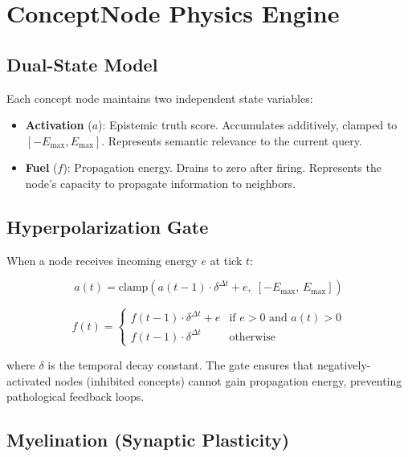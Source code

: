 \documentclass[11pt,a4paper]{article}
\begin{document}
\section{ConceptNode Physics Engine}
\label{sec:engine}

\subsection{Dual-State Model}

Each concept node maintains two independent state variables:

\begin{itemize}
  \item \textbf{Activation} ($a$): Epistemic truth score. Accumulates additively, clamped to $[-E_{\max}, E_{\max}]$. Represents semantic relevance to the current query.
  \item \textbf{Fuel} ($f$): Propagation energy. Drains to zero after firing. Represents the node's capacity to propagate information to neighbors.
\end{itemize}

\subsection{Hyperpolarization Gate}

When a node receives incoming energy $e$ at tick $t$:

\begin{equation}
a(t) = \mathrm{clamp}\!\left(a(t{-}1) \cdot \delta^{\Delta t} + e,\; [-E_{\max},\, E_{\max}]\right)
\label{eq:activation}
\end{equation}

\begin{equation}
f(t) =
\begin{cases}
f(t{-}1) \cdot \delta^{\Delta t} + e & \text{if } e > 0 \text{ and } a(t) > 0 \\
f(t{-}1) \cdot \delta^{\Delta t}     & \text{otherwise}
\end{cases}
\label{eq:fuel}
\end{equation}

where $\delta$ is the temporal decay constant. The gate ensures that negatively-activated nodes (inhibited concepts) cannot gain propagation energy, preventing pathological feedback loops.

\subsection{Myelination (Synaptic Plasticity)}
\end{document}
